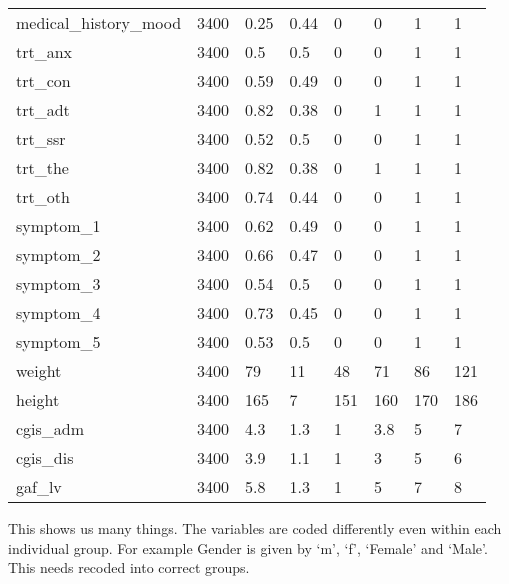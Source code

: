 \documentclass[
]{article}
\newenvironment{Shaded}{\begin{snugshade}}{\end{snugshade}}
\newcommand{\FunctionTok}[1]{\textcolor[rgb]{0.13,0.29,0.53}{\textbf{#1}}}
\newcommand{\NormalTok}[1]{#1}
\newcommand{\OtherTok}[1]{\textcolor[rgb]{0.56,0.35,0.01}{#1}}
\newcommand{\SpecialCharTok}[1]{\textcolor[rgb]{0.81,0.36,0.00}{\textbf{#1}}}
\newcommand{\StringTok}[1]{\textcolor[rgb]{0.31,0.60,0.02}{#1}}
\begin{document}
\begin{table}
\begin{tabular}[t]{llllllll}
medical\_history\_mood & 3400 & 0.25 & 0.44 & 0 & 0 & 1 & 1\\
trt\_anx & 3400 & 0.5 & 0.5 & 0 & 0 & 1 & 1\\
trt\_con & 3400 & 0.59 & 0.49 & 0 & 0 & 1 & 1\\
\addlinespace
trt\_adt & 3400 & 0.82 & 0.38 & 0 & 1 & 1 & 1\\
trt\_ssr & 3400 & 0.52 & 0.5 & 0 & 0 & 1 & 1\\
trt\_the & 3400 & 0.82 & 0.38 & 0 & 1 & 1 & 1\\
trt\_oth & 3400 & 0.74 & 0.44 & 0 & 0 & 1 & 1\\
symptom\_1 & 3400 & 0.62 & 0.49 & 0 & 0 & 1 & 1\\
\addlinespace
symptom\_2 & 3400 & 0.66 & 0.47 & 0 & 0 & 1 & 1\\
symptom\_3 & 3400 & 0.54 & 0.5 & 0 & 0 & 1 & 1\\
symptom\_4 & 3400 & 0.73 & 0.45 & 0 & 0 & 1 & 1\\
symptom\_5 & 3400 & 0.53 & 0.5 & 0 & 0 & 1 & 1\\
weight & 3400 & 79 & 11 & 48 & 71 & 86 & 121\\
\addlinespace
height & 3400 & 165 & 7 & 151 & 160 & 170 & 186\\
cgis\_adm & 3400 & 4.3 & 1.3 & 1 & 3.8 & 5 & 7\\
cgis\_dis & 3400 & 3.9 & 1.1 & 1 & 3 & 5 & 6\\
gaf\_lv & 3400 & 5.8 & 1.3 & 1 & 5 & 7 & 8\\
\bottomrule
\end{tabular}
\end{table}

This shows us many things. The variables are coded differently even
within each individual group. For example Gender is given by `m', `f',
`Female' and `Male'. This needs recoded into correct groups.

\begin{Shaded}
\end{Shaded}
\end{document}
